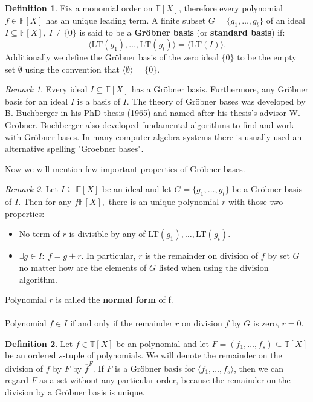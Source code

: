 \documentclass[thesis=M,english]{FITthesis}[2012/10/20]
\theoremstyle{remark}
\newtheorem*{RM}{Remark}
\theoremstyle{definition}
\newtheorem{DF}{Definition}[section]
\begin{document}
\begin{DF}
Fix a monomial order on $\mathbb{F}[X]$, therefore every polynomial $f \in \mathbb{F}[X]$ has an unique leading term. A finite subset $G = \{g_1, \ldots, g_t \}$ of an ideal $I \subseteq \mathbb{F}[X],\ I \neq \{ 0 \}$ is said to be a \textbf{Gröbner basis} (or \textbf{standard basis}) if:
$$
\langle \text{LT}(g_1), \ldots, \text{LT}(g_t) \rangle = \langle \text{LT}(I) \rangle.
$$
Additionally we define the Gröbner basis of the zero ideal $\{0\}$ to be the empty set $\emptyset$ using the convention that $\langle \emptyset \rangle = \{0\}.$
\end{DF}
\begin{RM}
Every ideal $I \subseteq \mathbb{F}[X]$ has a Gröbner basis. Furthermore, any Gröbner basis for an ideal $I$ is a basis of $I$. The theory of Gröbner bases was developed by B. Buchberger in his PhD thesis (1965) and named after his thesis's advisor W. Gröbner. Buchberger also developed fundamental algorithms to find and work with Gröbner bases. In many computer algebra systems there is usually used an alternative spelling "Groebner bases".
\end{RM}
\phantom{.}
\phantom{.}
\noindent Now we will mention few important properties of Gröbner bases.
\begin{RM}
Let $I \subseteq \mathbb{F}[X]$ be an ideal and let $G = \{g_1, \ldots, g_t\}$ be a Gröbner basis of $I$. Then for any $f \mathbb{F}[X],$ there is an unique polynomial $r$ with those two properties:
\begin{itemize}
\item No term of $r$ is divisible by any of LT$(g_1),\ldots,$LT$(g_t)$.
\item $\exists g \in I:\ f = g + r.$
In particular, $r$ is the remainder on division of $f$ by set $G$ no matter how are the elements of $G$ listed when using the division algorithm. 
\end{itemize}
Polynomial $r$ is called the \textbf{normal form} of f. \\ \\ 
\noindent Polynomial $f \in I$ if and only if the remainder $r$ on division $f$ by $G$ is zero, $r = 0.$
\end{RM}
\begin{DF}
Let $f \in \mathbb{T}[X]$ be an polynomial and let $F = (f_1, \ldots, f_s) \subseteq \mathbb{T}[X]$ be an ordered $s$-tuple of polynomials. We will denote the remainder on the division of $f$ by $F$ by $\overline{f}^F$. If $F$ is a Gröbner basis for $\langle f_1, \ldots, f_s \rangle$, then we can regard $F$ as a set without any particular order, because the remainder on the division by a Gröbner basis is unique.
\end{DF}
\end{document}
